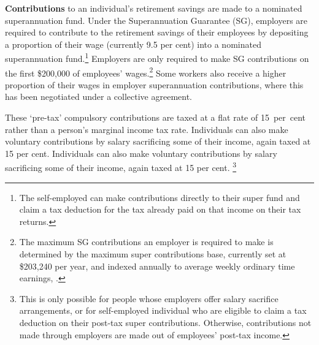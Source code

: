 \begin{figure}
\begin{minipage}[t]{0.33\columnwidth}
\vspace{5pt}
\end{minipage}
\end{figure}

\textbf{Contributions} to an individual’s retirement savings are made to a nominated superannuation fund. Under the Superannuation Guarantee (SG), employers are required to contribute to the retirement savings of their employees by depositing a proportion of their wage (currently 9.5 per cent) into a nominated superannuation fund.\footnote{The self-employed can make contributions directly to their super fund and claim a tax deduction for the tax already paid on that income on their tax returns.} Employers are only required to make SG contributions on the first \$200,000 of employees’ wages.\footnote{The maximum SG contributions an employer is required to make is determined by the maximum super contributions base, currently set at \$203,240 per year, and indexed annually to average weekly ordinary time earnings, \textcite{ATO2015MaxSuperContrBase}.} Some workers also receive a higher proportion of their wages in employer superannuation contributions, where this has been negotiated under a collective agreement.


These ‘pre-tax’ compulsory contributions are taxed at a flat rate of 15~per~cent rather than a person’s marginal income tax rate. Individuals can also make voluntary contributions by salary sacrificing some of their income, again taxed at 15 per cent. Individuals can also make voluntary contributions by salary sacrificing some of their income, again taxed at 15 per cent.%
\footnote{%
This is only possible for people whose employers offer salary sacrifice arrangements, or for self-employed individual who are eligible to claim a tax deduction on their post-tax super contributions. Otherwise, contributions not made through employers are made out of employees’ post-tax income.%
}  

